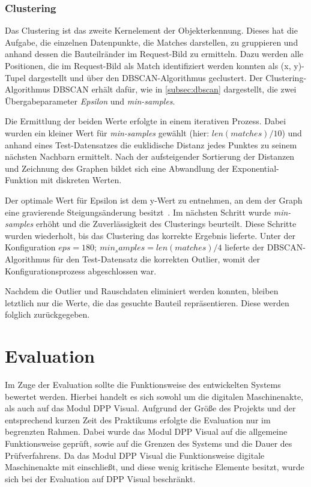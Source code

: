 \documentclass[
    type=Prakikumsbericht,
    status=draft, %
    language=german, %
    bibengine=bibtex,
]{unibwm-inf-thesis}
\begin{document}
    \subsection{Clustering} \label{subsubsec:clustering}
    Das Clustering ist das zweite Kernelement der Objekterkennung.
    Dieses hat die Aufgabe, die einzelnen Datenpunkte, die Matches darstellen, zu gruppieren und anhand dessen die Bauteilränder im Request-Bild zu ermitteln.
    Dazu werden alle Positionen, die im Request-Bild als Match identifiziert werden konnten als (x, y)-Tupel dargestellt und über den \ac{DBSCAN}-Algorithmus geclustert.
    Der Clustering-Algorithmus \ac{DBSCAN} erhält dafür, wie in \autoref{subsec:dbscan} dargestellt, die zwei Übergabeparameter \textit{Epsilon} und \textit{min-samples}.

    Die Ermittlung der beiden Werte erfolgte in einem iterativen Prozess.
    Dabei wurden ein kleiner Wert für \textit{min-samples} gewählt (hier: $len(matches) / 10 $) und anhand eines Test-Datensatzes die euklidische Distanz jedes Punktes zu seinem nächsten Nachbarn ermittelt.
    Nach der aufsteigender Sortierung der Distanzen und Zeichnung des Graphen bildet sich eine Abwandlung der Exponential-Funktion mit diskreten Werten.

    Der optimale Wert für Epsilon ist dem y-Wert zu entnehmen, an dem der Graph eine gravierende Steigungsänderung besitzt~\citep{Maklin2019}.
    Im nächsten Schritt wurde \textit{min-samples} erhöht und die Zuverlässigkeit des Clusterings beurteilt.
    Diese Schritte wurden wiederholt, bis das Clustering das korrekte Ergebnis lieferte.
    Unter der Konfiguration $eps = 180; ~ min_samples=len(matches) / 4$ lieferte der \ac{DBSCAN}-Algorithmus für den Test-Datensatz die korrekten Outlier, womit der Konfigurationsprozess abgeschlossen war.

    Nachdem die Outlier und Rauschdaten eliminiert werden konnten, bleiben letztlich nur die Werte, die das gesuchte Bauteil repräsentieren.
    Diese werden folglich zurückgegeben.


    \chapter{Evaluation} \label{ch:evaluation}
    Im Zuge der Evaluation sollte die Funktionsweise des entwickelten Systems bewertet werden.
    Hierbei handelt es sich sowohl um die digitalen Maschinenakte, als auch auf das Modul \ac{DPP} Visual.
    Aufgrund der Größe des Projekts und der entsprechend kurzen Zeit des Praktikums erfolgte die Evaluation nur im begrenzten Rahmen.
    Dabei wurde das Modul \ac{DPP} Visual auf die allgemeine Funktionsweise geprüft, sowie auf die Grenzen des Systems und die Dauer des Prüfverfahrens.
    Da das Modul \ac{DPP} Visual die Funktionsweise digitale Maschinenakte mit einschließt, und diese wenig kritische Elemente besitzt, wurde sich bei der Evaluation auf \ac{DPP} Visual beschränkt.
\end{document}
